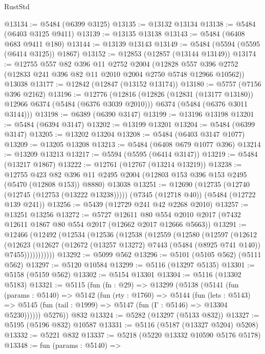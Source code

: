 \begin{lexlean}{RustStd}
\begin{coremodule}
@13134 := @5484 (@6399 @3125)
@13135 := @13132 @13134
@13138 := @5484 (@6403 @3125 @9411)
@13139 := @13135 @13138
@13143 := @5484 (@6408 @683 @9411 @180)
@13144 := @13139 @13143
@13149 := @5484 (@5594 (@5595 (@6414 @3125)) @1867)
@13152 := @12853 (@12857 (@13144 @13149))
@13174 := @12755
    @557
    @82
    @396
    @11
    @2752
    @2004
    (@12828 @557 @396 @2752 (@12833 @241 @396 @82 @11 @2010 @2004 @2750 @5748 @12966 @10562))
    @13038
@13177 := @12842 (@12847 (@13152 @13174))
@13180 := @5757 (@7156 @396 @2162)
@13196 := @12776
    (@12816
      (@12826 (@12831 (@13177 @13180)) @12966 @6374 (@5484 (@6376 @3039 @2010)))
      @6374
      (@5484 (@6376 @3011 @3144)))
@13198 := @6389 (@6390 @3147)
@13199 := @13196 @13198
@13201 := @5484 (@6394 @3147)
@13202 := @13199 @13201
@13204 := @5484 (@6399 @3147)
@13205 := @13202 @13204
@13208 := @5484 (@6403 @3147 @1077)
@13209 := @13205 @13208
@13213 := @5484 (@6408 @679 @1077 @396)
@13214 := @13209 @13213
@13217 := @5594 (@5595 (@6414 @3147))
@13219 := @5484 (@13217 @1867)
@13222 := @12761 (@12767 (@13214 @13219))
@13238 := @12755
    @423
    @82
    @396
    @11
    @2495
    @2004
    (@12803 @153 @396 @153 @2495 (@5470 (@12808 @153)) @8880)
    @13038
@13251 := @12690
    (@12735 (@12740 (@12745 (@12753 (@13222 @13238)))))
    (@7345 (@12718 @40))
    (@5484 (@12722 @139 @241))
@13256 := @5439 (@12729 @241 @42 @2268 @2010)
@13257 := @13251 @13256
@13272 := @5727
    @12611
    @80
    @554
    @2010
    @2017
    (@7432 @12611 @1867 @80 @554 @2017 (@12662 @2017 @12666 @5663))
@13291 := @12466
    (@12492
      (@12534
        (@12536
          (@12538
            (@12559
              (@12580
                (@12597
                  (@12612
                    (@12623
                      (@12627
                        (@12672 (@13257 @13272) @7443 (@5484 (@8925 @741 @140)) @7455)))))))))))
@13292 := @5099 @562
@13296 := @5101 (@5105 @562) (@5111 @562)
@13297 := @5120 @10584
@13299 := @5116 (@13297 @5135)
@13301 := @5158 (@5159 @562)
@13302 := @5154 @13301
@13304 := @5116 (@13302 @5183)
@13321 := @5115
    (fun (fn : @29) =>
    @13299
      (@5138
        (@5141
          (fun (params : @5140) =>
          @5142
            (fun (rty : @1760) =>
            @5144
              (fun (lets : @5143) =>
              @5145 (fun (tail : @1999) => @5147 (fun (Γ : @5146) => @13304 @5230))))))
        @5276))
    @832
@13324 := @5282 (@13297 (@5133 @832))
@13327 := @5195 (@5196 @832) @10587
@13331 := @5116 (@5187 (@13327 @5204) @5208)
@13332 := @5221 @832
@13337 := @5218 (@5220 @13332 @10590 @5176 @5178)
@13348 := fun (params : @5140) =>

\end{coremodule}
\end{lexlean}
